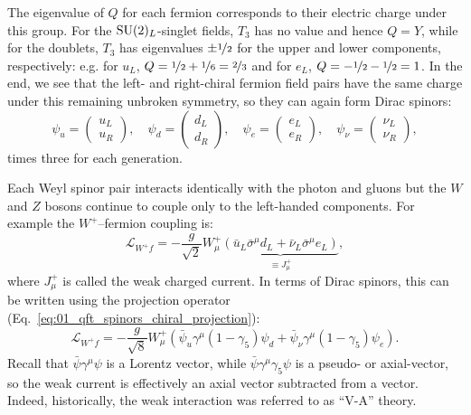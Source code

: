 The eigenvalue of $Q$ for each fermion corresponds to their electric charge under this group.
For the $\SU[2]_L$-singlet fields, $T_3$ has no value and hence $Q = Y$, while for the doublets, $T_3$ has eigenvalues $\pm \nicefrac{1}{2}$ for the upper and lower components, respectively: e.g. for $u_L$, $Q = \nicefrac{1}{2} + \nicefrac{1}{6} = \nicefrac{2}{3}$ and for $e_L$, $Q = -\nicefrac{1}{2}-\nicefrac{1}{2} = 1$.
In the end, we see that the left- and right-chiral fermion field pairs have the same charge under this remaining unbroken symmetry, so they can again form Dirac spinors:
\begin{equation}
	\label{eq:01_sm_ew_dirac}
	\psi_u = \begin{pmatrix} u_L \\ u_R \end{pmatrix}, \quad \psi_d = \begin{pmatrix} d_L \\ d_R \end{pmatrix}, \quad \psi_e = \begin{pmatrix} e_L \\ e_R \end{pmatrix}, \quad \psi_\nu = \begin{pmatrix} \nu_L \\ \nu_R \end{pmatrix},
\end{equation}
times three for each generation.

Each Weyl spinor pair interacts identically with the photon and gluons but the $W$ and $Z$ bosons continue to couple only to the left-handed components.
For example the $W^+$--fermion coupling is:
\begin{equation}
	\label{eq:01_sm_ew_w_coupling}
	\mathcal{L}_{W^+f} = -\frac{g}{\sqrt{2}} W^+_\mu \underbrace{\left(\bar{u}_L \bar\sigma^\mu d_L + \bar{\nu}_L \bar\sigma^\mu e_L\right)}_{\equiv J^+_\mu},
\end{equation}
where $J^+_\mu$ is called the weak charged current.
In terms of Dirac spinors, this can be written using the projection operator (Eq.~\ref{eq:01_qft_spinors_chiral_projection}):
\begin{equation}
	\label{eq:01_sm_ew_w_coupling_dirac}
	\mathcal{L}_{W^+f} = -\frac{g}{\sqrt{8}} W^+_\mu \left(\bar{\psi}_u \gamma^\mu (1 - \gamma_5) \psi_d + \bar{\psi}_\nu \gamma^\mu (1 - \gamma_5) \psi_e\right).
\end{equation}
Recall that $\bar\psi \gamma^\mu \psi$ is a Lorentz vector, while $\bar\psi \gamma^\mu \gamma_5 \psi$ is a pseudo- or axial-vector, so the weak current is effectively an axial vector subtracted from a vector.
Indeed, historically, the weak interaction was referred to as ``V-A'' theory.

